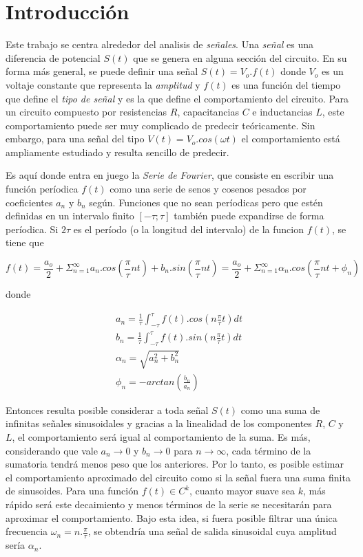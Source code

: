 \documentclass[11pt,a4paper]{article}
\begin{document}
\section{Introducción}\label{sec:intro}

Este trabajo se centra alrededor del analisis de \textit{señales}. Una \textit{señal} es una diferencia de potencial $S(t)$ que se genera en alguna sección del circuito. En su forma más general, se puede definir una señal $S(t) = V_o.f(t)$ donde $V_o$ es un voltaje constante que representa la \textit{amplitud} y $f(t)$ es una función del tiempo que define el \textit{tipo de señal} y es la que define el comportamiento del circuito. Para un circuito compuesto por resistencias $R$, capacitancias $C$ e inductancias $L$, este comportamiento puede ser muy complicado de predecir teóricamente. Sin embargo, para una señal del tipo $V(t) = V_o.cos(\omega t)$ el comportamiento está ampliamente estudiado y resulta sencillo de predecir. 

Es aquí donde entra en juego la \textit{Serie de Fourier}, que consiste en escribir una función períodica $f(t)$ como una serie de senos y cosenos pesados por coeficientes $a_n$ y $b_n$ según. Funciones que no sean períodicas pero que estén definidas en un intervalo finito $[-\tau;\tau]$ también puede expandirse de forma períodica. Si $2\tau$ es el período (o la longitud del intervalo) de la funcion $f(t)$, se tiene que

\begin{equation}
f(t) = \frac{a_o}{2} + \Sigma_{n=1}^{\infty} a_n.cos(\frac{\pi}{\tau}nt) + b_n.sin(\frac{\pi}{\tau}nt) = \frac{a_o}{2} + \Sigma_{n=1}^{\infty} \alpha_n.cos(\frac{\pi}{\tau}nt+\phi_n)
\label{eq:fourier}
\end{equation}

donde 

\begin{equation}
\begin{split}
a_n = \frac{1}{\tau}\int_{-\tau}^{\tau}f(t).cos(n\frac{\pi}{\tau}t)dt\\
b_n = \frac{1}{\tau}\int_{-\tau}^{\tau}f(t).sin(n\frac{\pi}{\tau}t)dt\\
\alpha_n = \sqrt{a_n^2+b_n^2}\\
\phi_n = -arctan(\frac{b_n}{a_n})
\end{split}
\label{eq:coefs}
\end{equation}

Entonces resulta posible considerar a toda señal $S(t)$ como una suma de infinitas señales sinusoidales y gracias a la linealidad de los componentes $R$, $C$ y $L$, el comportamiento será igual al comportamiento de la suma. Es más, considerando que vale $a_n \rightarrow 0$ y $b_n \rightarrow 0$ para $n \rightarrow \infty$, cada término de la sumatoria tendrá menos peso que los anteriores. Por lo tanto, es posible estimar el comportamiento aproximado del circuito como si la señal fuera una suma finita de sinusoides. Para una función $f(t)\in C^k$, cuanto mayor suave sea $k$, más rápido será este decaimiento y menos términos de la serie se necesitarán para aproximar el comportamiento. Bajo esta idea, si fuera posible filtrar una única frecuencia $\omega_n = n.\frac{\pi}{\tau}$, se obtendría una señal de salida sinusoidal cuya amplitud sería $\alpha_n$. 
\end{document}
